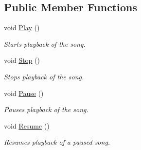 \subsection*{Public Member Functions}
\begin{DoxyCompactItemize}
\item 
void \hyperlink{interface_tri_devs_1_1_tri_engine_1_1_audio_1_1_i_song_af0ef0365ddb942ab4ac5a029b2f377c6}{Play} ()
\begin{DoxyCompactList}\small\item\em Starts playback of the song. \end{DoxyCompactList}\item 
void \hyperlink{interface_tri_devs_1_1_tri_engine_1_1_audio_1_1_i_song_a067e96e7f83b12ce14edd82f762532a3}{Stop} ()
\begin{DoxyCompactList}\small\item\em Stops playback of the song. \end{DoxyCompactList}\item 
void \hyperlink{interface_tri_devs_1_1_tri_engine_1_1_audio_1_1_i_song_ac8cfcbe3c475cea3542c50490987c120}{Pause} ()
\begin{DoxyCompactList}\small\item\em Pauses playback of the song. \end{DoxyCompactList}\item 
void \hyperlink{interface_tri_devs_1_1_tri_engine_1_1_audio_1_1_i_song_a6493e500269f8e92b642a262a393f876}{Resume} ()
\begin{DoxyCompactList}\small\item\em Resumes playback of a paused song. \end{DoxyCompactList}\end{DoxyCompactItemize}
